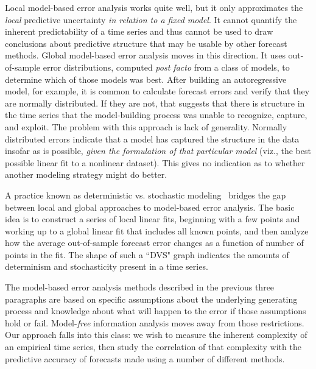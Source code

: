 \documentclass[%
pre,
reprint,
superscriptaddress,
showpacs,
nofootinbib,
nobibnotes,
 amsmath,amssymb,
 aps,
]{revtex4-1}
\begin{document}
Local model-based error analysis works quite well, but it only
approximates the \emph{local} predictive uncertainty \emph{in relation
  to a fixed model}.  It cannot quantify the inherent predictability
of a time series and thus cannot be used to draw conclusions about
predictive structure that may be usable by other forecast methods.
%
%
Global model-based error analysis moves in this direction.  It uses
out-of-sample error distributions, computed \emph{post facto} from a
class of models, to determine which of those models was best.  After
building an autoregressive model, for example, it is common to
calculate forecast errors and verify that they are normally
distributed.  If they are not, that suggests that there is structure
in the time series that the model-building process was unable to
recognize, capture, and exploit.  The problem with this approach is
lack of generality.
\label{page:normal-errors}
Normally distributed errors indicate that a model has captured the
structure in the data insofar as is possible, \emph{given the
  formulation of that particular model} (viz., the best possible
linear fit to a nonlinear dataset).  This gives no indication as to
whether another modeling strategy might do better.


A practice known as deterministic vs. stochastic
modeling~\cite{weigend93, Casdagli92dvsplots} bridges the gap
between local and global approaches to model-based error analysis.
The basic idea is to construct a series of local linear fits,
beginning with a few points and working up to a global linear fit that
includes all known points, and then analyze how the average
out-of-sample forecast error changes as a function of number of points
in the fit. The shape of such a ``DVS" graph indicates the amounts of
determinism and stochasticity present in a time series.

The model-based error analysis methods described in the previous three
paragraphs are based on specific assumptions about the underlying
generating process and knowledge about what will happen to the error
if those assumptions hold or fail.  Model-\emph{free} information
analysis moves away from those restrictions.  Our approach falls into
this class: we wish to measure the inherent complexity of an empirical
time series, then study the correlation of that complexity with the
predictive accuracy of forecasts made using a number of different
methods.
\end{document}
